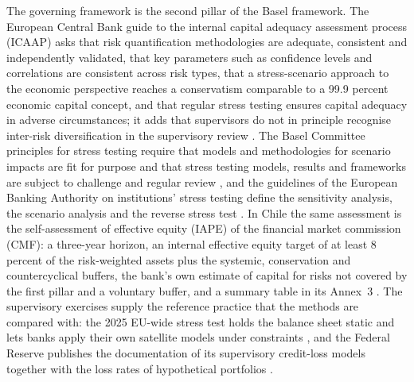 The governing framework is the second pillar of the Basel framework. The European Central Bank guide to the internal capital
adequacy assessment process (ICAAP) asks that risk quantification methodologies are adequate, consistent and independently
validated, that key parameters such as confidence levels and correlations are consistent across risk types, that a
stress-scenario approach to the economic perspective reaches a conservatism comparable to a 99.9 percent economic capital
concept, and that regular stress testing ensures capital adequacy in adverse circumstances; it adds that supervisors do not in principle recognise inter-risk
diversification in the supervisory review \citep{aggregation-stress:ecb2018}. The Basel Committee principles for stress testing
require that models and methodologies for scenario impacts are fit for purpose and that stress testing models, results and
frameworks are subject to challenge and regular review \citep{aggregation-stress:bcbs2018}, and the guidelines of the European
Banking Authority on institutions' stress testing define the sensitivity analysis, the scenario analysis and the reverse stress
test \citep{aggregation-stress:ebagl2018}. In Chile the same assessment is the self-assessment of effective equity (IAPE) of the
financial market commission (CMF): a three-year horizon, an internal effective equity target of at least 8 percent of the
risk-weighted assets plus the systemic, conservation and countercyclical buffers, the bank's own estimate of capital for risks
not covered by the first pillar and a voluntary buffer, and a summary table in its Annex~3 \citep{aggregation-stress:cmf2025}. The supervisory exercises supply the reference practice that the methods are
compared with: the 2025 EU-wide stress test holds the balance sheet static and lets banks apply their own satellite models under
constraints \citep{aggregation-stress:ebanote2025,aggregation-stress:ebaresults2025}, and the Federal Reserve publishes the
documentation of its supervisory credit-loss models together with the loss rates of hypothetical portfolios
\citep{lgd-ead:fedmethod2025,aggregation-stress:fedcredit2026}.

